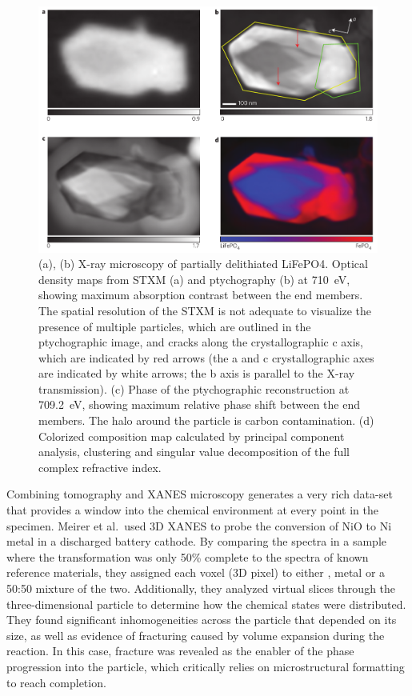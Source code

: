 \documentclass[journal=cmatex,manuscript=perspective]{achemso}
\begin{document}
\begin{figure}
  \includegraphics[width=\textwidth]{shapiro2014-2.png}
  \caption{(a), (b) X-ray microscopy of partially delithiated
    LiFePO4. Optical density maps from STXM (a) and ptychography (b)
    at \SI{710}{eV}, showing maximum absorption contrast between the end
    members. The spatial resolution of the STXM is not adequate to
    visualize the presence of multiple particles, which are outlined
    in the ptychographic image, and cracks along the crystallographic
    c axis, which are indicated by red arrows (the a and c
    crystallographic axes are indicated by white arrows; the b axis is
    parallel to the X-ray transmission). (c) Phase of the
    ptychographic reconstruction at \SI{709.2}{eV}, showing maximum relative
    phase shift between the end members. The halo around the particle
    is carbon contamination. (d) Colorized composition map calculated
    by principal component analysis, clustering and singular value
    decomposition of the full complex refractive index.\cite{shapiro2014}}
  \label{figure:shapiro2014-2}
\end{figure}

Combining tomography and XANES microscopy generates a very rich
data-set that provides a window into the chemical environment at every
point in the specimen. Meirer et al.\ used 3D XANES to probe the
conversion of NiO to Ni metal in a discharged battery
cathode\cite{meirer2011}. By comparing the spectra in a sample where
the transformation was only 50\% complete to the spectra of known
reference materials, they assigned each voxel (3D pixel) to either
,  metal or a 50:50 mixture of the two. Additionally,
they analyzed virtual slices through the three-dimensional particle to
determine how the chemical states were distributed. They found
significant inhomogeneities across the particle that depended on its
size, as well as evidence of fracturing caused by volume expansion
during the reaction. In this case, fracture was revealed as the
enabler of the phase progression into the particle, which critically
relies on microstructural formatting to reach completion.
\end{document}
